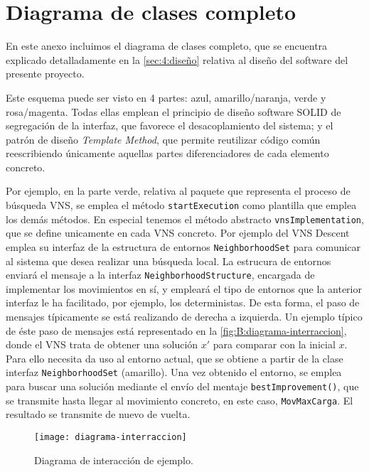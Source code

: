 \graphicspath{{anexos/AnexoB-Diagrama-Clases-Completo/recursos/}}

\section{Diagrama de clases completo} \label{Anexo:diagrama-clases}

En este anexo incluimos el diagrama de clases completo, que se encuentra explicado detalladamente en la \autoref{sec:4:diseño} relativa al diseño del software del presente proyecto.

Este esquema puede ser visto en 4 partes: azul, amarillo/naranja, verde y rosa/magenta. Todas ellas emplean el principio de diseño software SOLID de segregación de la interfaz, que favorece el desacoplamiento del sistema; y el patrón de diseño \textit{Template Method}, que permite reutilizar código común reescribiendo únicamente aquellas partes diferenciadores de cada elemento concreto.

Por ejemplo, en la parte verde, relativa al paquete que representa el proceso de búsqueda VNS, se emplea el método \texttt{startExecution} como plantilla que emplea los demás métodos. En especial tenemos el método abstracto \texttt{vnsImplementation}, que se define unicamente en cada VNS concreto. Por ejemplo del VNS Descent emplea su interfaz de la estructura de entornos \texttt{NeighborhoodSet} para comunicar al sistema que desea realizar una búsqueda local. La estrucura de entornos enviará el mensaje a la interfaz \texttt{NeighborhoodStructure}, encargada de implementar los movimientos en sí, y empleará el tipo de entornos que la anterior interfaz le ha facilitado, por ejemplo, los deterministas. De esta forma, el paso de mensajes típicamente se está realizando de derecha a izquierda. Un ejemplo típico de éste paso de mensajes está representado en la \autoref{fig:B:diagrama-interraccion}, donde el VNS trata de obtener una solución $x'$ para comparar con la inicial $x$. Para ello necesita da uso al entorno actual, que se obtiene a partir de la clase interfaz \texttt{NeighborhoodSet} (amarillo). Una vez obtenido el entorno, se emplea para buscar una solución mediante el envío del mentaje \texttt{bestImprovement()}, que se transmite hasta llegar al movimiento concreto, en este caso, \texttt{MovMaxCarga}. El resultado se transmite de nuevo de vuelta.

\begin{figure}[h]
	\centering
	\texttt{[image: diagrama-interraccion]}
	\caption{Diagrama de interacción de ejemplo.}
	\label{fig:B:diagrama-interraccion}
\end{figure}

\begin{landscape}
	
\end{landscape}
